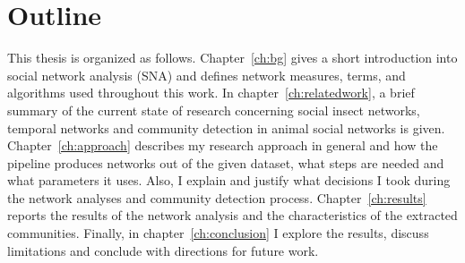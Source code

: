 \section{Outline}
This thesis is organized as follows. Chapter~\ref{ch:bg} gives a short introduction into social network analysis (SNA) and defines network measures, terms, and algorithms used throughout this work.
In chapter~\ref{ch:relatedwork}, a brief summary of the current state of research concerning social insect networks, temporal networks and community detection in animal social networks is given.
Chapter~\ref{ch:approach} describes my research approach in general and how the pipeline produces networks out of the given dataset, what steps are needed and what parameters it uses.
Also, I explain and justify what decisions I took during the network analyses and community detection process.
Chapter~\ref{ch:results} reports the results of the network analysis and the characteristics of the extracted communities.
Finally, in chapter~\ref{ch:conclusion} I explore the results, discuss limitations and conclude with directions for future work.